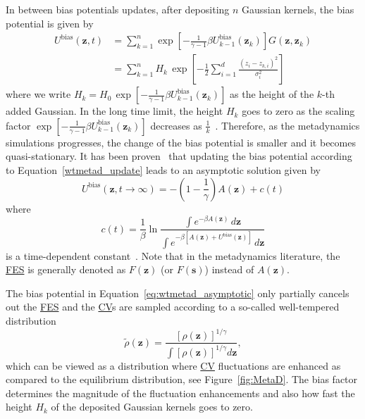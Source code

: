 \documentclass[9pt,review]{livecoms}
\newcommand{\vz}{\mathbf{z}}
\begin{document}
In between bias potentials updates, after depositing $n$ Gaussian kernels, the bias potential is given by
\begin{align}
\label{wtmetad_sum}
U^{\mathrm{bias}}(\vz,t) &=
\sum_{k=1}^{n}
\exp \left[-\frac{1}{\gamma-1} \beta  U^{\mathrm{bias}}_{k-1}(\vz_k)\right]
G(\vz,\vz_{k})
\nonumber
\\
& =
\sum_{k=1}^{n}
H_{k} \,
\exp \left[-\frac{1}{2}\sum^{d}_{i=1} \frac{(z_i-z_{k,i})^2}{\sigma^2_i} \right]
\end{align}
where we write $H_{k} = H_{0} \, \exp \left[-\frac{1}{\gamma-1} \beta U^{\mathrm{bias}}_{k-1}(\vz_k)\right]$ as the height of the $k$-th added Gaussian.
In the long time limit, the height $H_k$ goes to zero as the scaling factor $\exp \left[-\frac{1}{\gamma-1} \beta U^{\mathrm{bias}}_{k-1}(\vz_k)   \right]$ decreases as $\frac{1}{k}$~\cite{Barducci-PRL-2008,Dama-PRL-2014}. Therefore, as the metadynamics simulations progresses, the change of the bias potential is smaller and it becomes quasi-stationary.
It has been proven~\cite{Dama-PRL-2014} that updating the bias potential according to Equation~\ref{wtmetad_update} leads to an asymptotic solution given by
\begin{equation}
\label{eq:wtmetad_asymptotic}
U^{\mathrm{bias}}(\vz,t \to \infty) = - \left(1-\frac{1}{\gamma} \right)
A(\vz) + c(t)
\end{equation}
where
\begin{equation}
\label{wtmetad_coft}
c(t) = \frac{1}{\beta} \ln
\frac
{\int e^{-\beta A(\vz)} \,  d\vz }
{\int e^{-\beta \left[ A(\vz) + U^{\mathrm{bias}}(\vz) \right]} \, d\vz }
\end{equation}
is a time-dependent constant~\cite{tiwary_rewt}. Note that in the metadynamics literature, the \hyperlink{ref:FES} {FES} is generally denoted as $F(\vz)$ (or $F(\mathbf{s})$) instead of $A(\vz)$.


The bias potential in Equation~\ref{eq:wtmetad_asymptotic} only partially cancels out the \hyperlink{ref:FES} {FES} and the \hyperlink{ref:CV} {CV}s  are sampled according to a so-called well-tempered distribution
\begin{equation}
\label{eq:wtmetad_wtdist}
\tilde{\rho}(\vz) =
\frac
{[\rho(\vz)]^{1/\gamma}}
{\int [\rho(\vz)]^{1/\gamma} d\vz},
\end{equation}
which can be viewed as a distribution where \hyperlink{ref:CV} {CV} fluctuations are enhanced as compared to the equilibrium distribution, see Figure~\ref{fig:MetaD}. The bias factor determines the magnitude of the fluctuation enhancements and also how fast the height $H_{k}$ of the deposited Gaussian kernels goes to zero.
\end{document}
